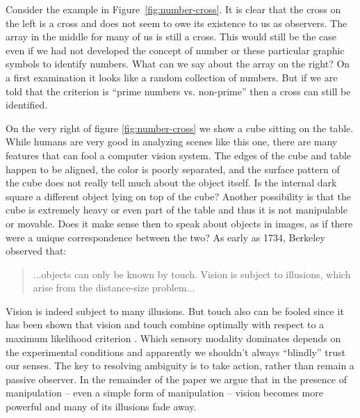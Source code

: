 Consider the example in Figure~\ref{fig:number-cross}. It is
clear that the cross on the left is a cross and does not seem to owe 
its existence to us as observers. The array in the middle for
many of us is still a cross. This would still be the case 
even if we had not developed the concept of number or these particular
graphic symbols to identify numbers. What can we say about the array 
on the right? On a first examination it looks like a random collection
of numbers. But if we are told that the criterion is ``prime numbers 
vs. non-prime'' then a cross can still be identified.

%
%
On the very right of figure \ref{fig:number-cross} we show a 
cube sitting on the table. While humans are very good in analyzing
scenes like this one, there are many features that can fool
a computer vision system. The edges of the cube and table 
happen to be aligned, the color is poorly separated, and the surface
pattern of the cube does not really tell much about the object
itself. Is the internal dark square a different object lying on 
top of the cube? Another possibility is that the cube is extremely
heavy or even part of the table and thus it is not manipulable or
movable. Does it make sense then to speak about objects in images,
as if there were a unique correspondence between the two?
As early as 1734, Berkeley observed that:
%
\begin{quote}
...objects can only be known by
touch. Vision is subject to illusions, which arise from the
distance-size problem... \cite{berkeley72new}
\end{quote}
%
Vision is indeed subject to many illusions.  But touch also can be
fooled since it has been shown that vision and touch combine 
optimally with respect to a maximum likelihood criterion 
\cite{ernst-banks-2002}. Which sensory modality dominates 
depends on the experimental conditions and apparently we 
shouldn't always ``blindly'' trust our senses.
The key to resolving ambiguity is to take action, rather than remain
a passive observer.
In the remainder of the paper we argue that in the presence of
manipulation -- even a simple form of manipulation -- vision 
becomes more powerful and many of its illusions fade away.



